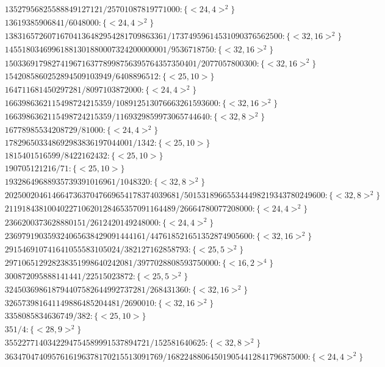 \documentclass[11pt,reqno]{amsart}
\theoremstyle{plain}
\theoremstyle{definition}
\begin{document}
{\begin{align*}
&13527956825588849127121/25701087819771000:\{ <24, 4>^2 \}\\
&13619385906841/6048000:\{ <24, 4>^2 \}\\
&13831657260716704136482954281709863361/17374959614531090376562500:\{ <32, 16>^2 \}\\
&14551803469961881301880007324200000001/9536718750:\{ <32, 16>^2 \}\\
&150336917982741967163778998756395764357350401/2077057800300:\{ <32, 16>^2 \}\\
&1542085860252894509103949/6408896512:\{ <25, 10> \}\\
&164711681450297281/8097103872000:\{ <24, 4>^2 \}\\
&1663986362115498724215359/108912513076663261593600:\{ <32, 16>^2 \}\\
&1663986362115498724215359/1169329859973065744640:\{ <32, 8>^2 \}\\
&16778985534208729/81000:\{ <24, 4>^2 \}\\
&178296503348692983836197044001/1342:\{ <25, 10> \}\\
&1815401516599/8422162432:\{ <25, 10> \}\\
&190705121216/71:\{ <25, 10> \}\\
&19328649688935739391016961/1048320:\{ <32, 8>^2 \}\\
&20250020461466473637047669654178374039681/501531896655344498219343780249600:\{ <32, 8>^2 \}\\
&2119184381004022710620128465357091164489/26664780077208000:\{ <24, 4>^2 \}\\
&2366200373628880151/2612420149248000:\{ <24, 4>^2 \}\\
&236979190359324065638429091444161/447618521651352874905600:\{ <32, 16>^2 \}\\
&291546910741641055583105024/382127162858793:\{ <25, 5>^2 \}\\
&297106512928238351998640242081/3977028808593750000:\{ <16, 2>^4 \}\\
&300872095888141441/22515023872:\{ <25, 5>^2 \}\\
&324503698618794407582644992737281/268431360:\{ <32, 16>^2 \}\\
&326573981641149886485204481/2690010:\{ <32, 16>^2 \}\\
&3358085834636749/382:\{ <25, 10> \}\\
&351/4:\{ <28, 9>^2 \}\\
&3552277140342294754589991537894721/152581640625:\{ <32, 8>^2 \}\\
&3634704740957616196378170215513091769/168224880645019054412841796875000:\{ <24, 4>^2 \}\\

\end{align*}}
\end{document}
